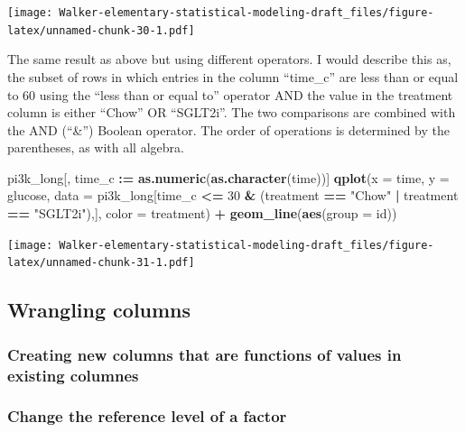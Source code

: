 \documentclass[]{book}
\newenvironment{Shaded}{\begin{snugshade}}{\end{snugshade}}
\newcommand{\DataTypeTok}[1]{\textcolor[rgb]{0.13,0.29,0.53}{#1}}
\newcommand{\DecValTok}[1]{\textcolor[rgb]{0.00,0.00,0.81}{#1}}
\newcommand{\ErrorTok}[1]{\textcolor[rgb]{0.64,0.00,0.00}{\textbf{#1}}}
\newcommand{\KeywordTok}[1]{\textcolor[rgb]{0.13,0.29,0.53}{\textbf{#1}}}
\newcommand{\NormalTok}[1]{#1}
\newcommand{\OperatorTok}[1]{\textcolor[rgb]{0.81,0.36,0.00}{\textbf{#1}}}
\newcommand{\StringTok}[1]{\textcolor[rgb]{0.31,0.60,0.02}{#1}}
\begin{document}
\texttt{[image: Walker-elementary-statistical-modeling-draft\_files/figure-latex/unnamed-chunk-30-1.pdf]}

The same result as above but using different operators. I would describe this as, the subset of rows in which entries in the column ``time\_c'' are less than or equal to 60 using the ``less than or equal to'' operator AND the value in the treatment column is either ``Chow'' OR ``SGLT2i''. The two comparisons are combined with the AND (``\&'') Boolean operator. The order of operations is determined by the parentheses, as with all algebra.

\begin{Shaded}
\begin{Highlighting}[]
\NormalTok{pi3k_long[, time_c }\OperatorTok{:}\ErrorTok{=}\StringTok{ }\KeywordTok{as.numeric}\NormalTok{(}\KeywordTok{as.character}\NormalTok{(time))]}
\KeywordTok{qplot}\NormalTok{(}\DataTypeTok{x =}\NormalTok{ time,}
      \DataTypeTok{y =}\NormalTok{ glucose,}
      \DataTypeTok{data =}\NormalTok{ pi3k_long[time_c }\OperatorTok{<=}\StringTok{ }\DecValTok{30} \OperatorTok{&}\StringTok{ }\NormalTok{(treatment }\OperatorTok{==}\StringTok{ "Chow"} \OperatorTok{|}\StringTok{ }\NormalTok{treatment }\OperatorTok{==}\StringTok{ "SGLT2i"}\NormalTok{),],}
      \DataTypeTok{color =}\NormalTok{ treatment) }\OperatorTok{+}
\StringTok{  }\KeywordTok{geom_line}\NormalTok{(}\KeywordTok{aes}\NormalTok{(}\DataTypeTok{group =}\NormalTok{ id))}
\end{Highlighting}
\end{Shaded}

\texttt{[image: Walker-elementary-statistical-modeling-draft\_files/figure-latex/unnamed-chunk-31-1.pdf]}

\hypertarget{wrangling-columns}{%
\subsection{Wrangling columns}\label{wrangling-columns}}

\hypertarget{creating-new-columns-that-are-functions-of-values-in-existing-columnes}{%
\subsubsection{Creating new columns that are functions of values in existing columnes}\label{creating-new-columns-that-are-functions-of-values-in-existing-columnes}}

\hypertarget{change-the-reference-level-of-a-factor}{%
\subsubsection{Change the reference level of a factor}\label{change-the-reference-level-of-a-factor}}
\end{document}
